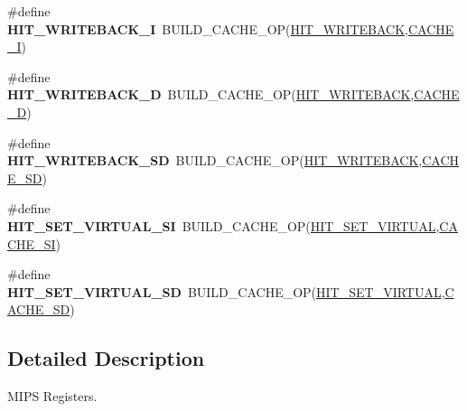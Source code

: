 \begin{DoxyCompactItemize}
\#define {\bfseries H\+I\+T\+\_\+\+W\+R\+I\+T\+E\+B\+A\+C\+K\+\_\+I}~B\+U\+I\+L\+D\+\_\+\+C\+A\+C\+H\+E\+\_\+\+OP(\mbox{\hyperlink{group__mips__regs_ga8fe54f84daef50318a97d2fa989d1573}{H\+I\+T\+\_\+\+W\+R\+I\+T\+E\+B\+A\+CK}},\mbox{\hyperlink{group__mips__regs_gac038c307d75c414069699d4c2741714f}{C\+A\+C\+H\+E\+\_\+I}})
\item 
\mbox{\label{group__mips__regs_gacc0a1bde7025c329787fb51556ba5a8c}} 
\#define {\bfseries H\+I\+T\+\_\+\+W\+R\+I\+T\+E\+B\+A\+C\+K\+\_\+D}~B\+U\+I\+L\+D\+\_\+\+C\+A\+C\+H\+E\+\_\+\+OP(\mbox{\hyperlink{group__mips__regs_ga8fe54f84daef50318a97d2fa989d1573}{H\+I\+T\+\_\+\+W\+R\+I\+T\+E\+B\+A\+CK}},\mbox{\hyperlink{group__mips__regs_ga0fba561a0aa459e322839f78cc09f839}{C\+A\+C\+H\+E\+\_\+D}})
\item 
\mbox{\label{group__mips__regs_ga9f512ad76ef0bf94bc75d55d9b0e0edc}} 
\#define {\bfseries H\+I\+T\+\_\+\+W\+R\+I\+T\+E\+B\+A\+C\+K\+\_\+\+SD}~B\+U\+I\+L\+D\+\_\+\+C\+A\+C\+H\+E\+\_\+\+OP(\mbox{\hyperlink{group__mips__regs_ga8fe54f84daef50318a97d2fa989d1573}{H\+I\+T\+\_\+\+W\+R\+I\+T\+E\+B\+A\+CK}},\mbox{\hyperlink{group__mips__regs_gae713c0e6cb5df3df0030d5d87bb16a6d}{C\+A\+C\+H\+E\+\_\+\+SD}})
\item 
\mbox{\label{group__mips__regs_ga5fb5ec317f0dca94e088cc6185b92803}} 
\#define {\bfseries H\+I\+T\+\_\+\+S\+E\+T\+\_\+\+V\+I\+R\+T\+U\+A\+L\+\_\+\+SI}~B\+U\+I\+L\+D\+\_\+\+C\+A\+C\+H\+E\+\_\+\+OP(\mbox{\hyperlink{group__mips__regs_gab35e7de12f3d04df816bd97f619fccf1}{H\+I\+T\+\_\+\+S\+E\+T\+\_\+\+V\+I\+R\+T\+U\+AL}},\mbox{\hyperlink{group__mips__regs_gaa127e30b313e010b0c7b53c97503b6ce}{C\+A\+C\+H\+E\+\_\+\+SI}})
\item 
\mbox{\label{group__mips__regs_gad1a99aa6dddc5af2bf91e12b1c04b5ab}} 
\#define {\bfseries H\+I\+T\+\_\+\+S\+E\+T\+\_\+\+V\+I\+R\+T\+U\+A\+L\+\_\+\+SD}~B\+U\+I\+L\+D\+\_\+\+C\+A\+C\+H\+E\+\_\+\+OP(\mbox{\hyperlink{group__mips__regs_gab35e7de12f3d04df816bd97f619fccf1}{H\+I\+T\+\_\+\+S\+E\+T\+\_\+\+V\+I\+R\+T\+U\+AL}},\mbox{\hyperlink{group__mips__regs_gae713c0e6cb5df3df0030d5d87bb16a6d}{C\+A\+C\+H\+E\+\_\+\+SD}})
\end{DoxyCompactItemize}


\subsection{Detailed Description}
M\+I\+PS Registers. 

